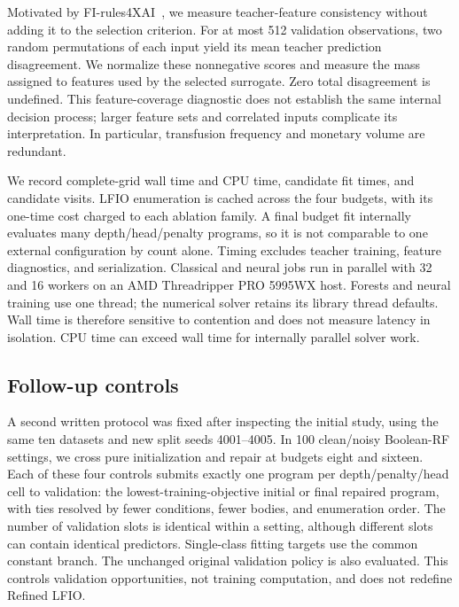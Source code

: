 \documentclass[a4paper,fleqn,review]{cas-sc}
\begin{document}
Motivated by FI-rules4XAI~\citep{kozielski2025}, we measure teacher-feature consistency without adding it to the selection criterion. For at most 512 validation observations, two random permutations of each input yield its mean teacher prediction disagreement. We normalize these nonnegative scores and measure the mass assigned to features used by the selected surrogate. Zero total disagreement is undefined. This feature-coverage diagnostic does not establish the same internal decision process; larger feature sets and correlated inputs complicate its interpretation. In particular, transfusion frequency and monetary volume are redundant.

We record complete-grid wall time and CPU time, candidate fit times, and candidate visits. LFIO enumeration is cached across the four budgets, with its one-time cost charged to each ablation family. A final budget fit internally evaluates many depth/head/penalty programs, so it is not comparable to one external configuration by count alone. Timing excludes teacher training, feature diagnostics, and serialization. Classical and neural jobs run in parallel with 32 and 16 workers on an AMD Threadripper PRO 5995WX host. Forests and neural training use one thread; the numerical solver retains its library thread defaults. Wall time is therefore sensitive to contention and does not measure latency in isolation. CPU time can exceed wall time for internally parallel solver work.

\subsection{Follow-up controls}\label{sec:followup-protocol}
A second written protocol was fixed after inspecting the initial study, using the same ten datasets and new split seeds 4001--4005. In 100 clean/noisy Boolean-RF settings, we cross pure initialization and repair at budgets eight and sixteen. Each of these four controls submits exactly one program per depth/penalty/head cell to validation: the lowest-training-objective initial or final repaired program, with ties resolved by fewer conditions, fewer bodies, and enumeration order. The number of validation slots is identical within a setting, although different slots can contain identical predictors. Single-class fitting targets use the common constant branch. The unchanged original validation policy is also evaluated. This controls validation opportunities, not training computation, and does not redefine Refined LFIO.
\end{document}
